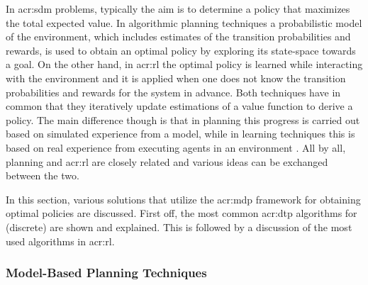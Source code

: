 In \acrshort{acr:sdm} problems, typically the aim is to determine a policy that maximizes the total expected value.
In algorithmic planning techniques a probabilistic model of the environment, which includes estimates of the transition probabilities and rewards, is used to obtain an optimal policy by exploring its state-space towards a goal.
On the other hand, in \acrfull{acr:rl} the optimal policy is learned while interacting with the environment and it is applied when one does not know the transition probabilities and rewards for the system in advance.
Both techniques have in common that they iteratively update estimations of a value function to derive a policy.
The main difference though is that in planning this progress is carried out based on simulated experience from a model, while in learning techniques this is based on real experience from executing agents in an environment \cite{sutton1998reinforcement}.
All by all, planning and \acrshort{acr:rl} are closely related and various ideas can be exchanged between the two.

In this section, various solutions that utilize the \acrshort{acr:mdp} framework for obtaining optimal policies are discussed.
First off, the most common \acrshort{acr:dtp} algorithms for (discrete)  are shown and explained.
This is followed by a discussion of the most used algorithms in \acrshort{acr:rl}.





\subsubsection{Model-Based Planning Techniques}
\label{sec:model-based-planning}

